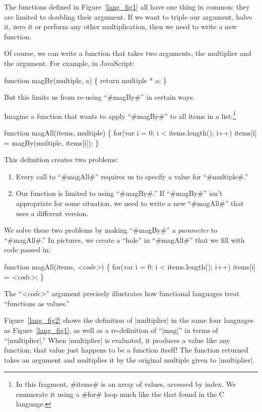 \documentclass[12pt]{report}
\begin{document}
The functions defined in Figure~\ref{lang_fig1} all have one thing in
common: they are limited to doubling their argument. If we want to
triple our argument, halve it, zero it or perform any other
multiplication, then we need to write a new function.

Of course, we can write a function that takes two arguments, the
multiplier and the argument. For example, in JavaScript:
\begin{AVerb}
function magBy(multiple, a) \{
  return multiple * a;
\}
\end{AVerb}
But this limits us from re-using ``#magBy#'' in certain ways. 

Imagine a function that wants to apply ``#magBy#'' to all items in a
list:\footnote{In this fragment, #items# is an array of values,
  accessed by index. We enumerate it using a #for# loop much like the
  that found in the C language.}
\begin{AVerb}
function magAll(items, multiple) \{
  for(var i = 0; i < items.length(); i++)
    items[i] = magBy(multiple, items[i]);
\}
\end{AVerb}
This definition creates two problems:
\begin{enumerate}
\item Every call to ``#magAll#'' requires us to specify a value for
  ``#multiple#.'' 
\item Our function is limited to using ``#magBy#.'' If ``#magBy#''
  isn't appropriate for some situation, we need to write a new
  ``#magAll#'' that uses a different version.
\end{enumerate}
We solve these two problems by making ``#magBy#'' a \emph{parameter}
to ``#magAll#.'' In pictures, we create a ``hole'' in ``#magAll#''
that we fill with code passed in:
\begin{AVerb}
function magAll(items, \emph{<code>}) \{
  for(var i = 0; i < items.length(); i++)
    items[i] = \emph{<code>};
\}
\end{AVerb}
The ``\emph{<code>}'' argument precisely illustrates how 
functional languages treat ``functions as values.''

Figure~\ref{lang_fig2} shows the definition of |multiplier| in the
same four languages as Figure~\ref{lang_fig1}, as well as a re-definition
of ``|mag|'' in terms of ``|multiplier|.'' When |multiplier| is
evaluated, it produces a value like any function; that value just
happens to be a function itself! The function returned takes an
argument and multiplies it by the original multiple given to
|multiplier|.
\end{document}
